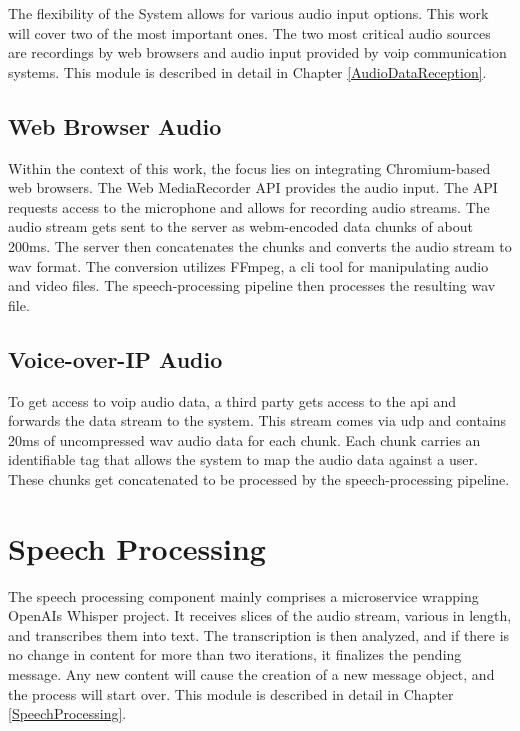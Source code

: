 The flexibility of the System allows for various audio input options. This work will cover two of the most important 
ones. The two most critical audio sources are recordings by web browsers and audio input provided by \ac{voip} 
communication systems. This module is described in detail in Chapter \ref{AudioDataReception}.

\subsection{Web Browser Audio}

Within the context of this work, the focus lies on integrating Chromium-based web browsers. The Web MediaRecorder API 
provides the audio input. The API requests access to the microphone and allows for recording audio streams. 
The audio stream gets sent to the server as \ac{webm}-encoded data chunks of about 200ms. The server then concatenates 
the chunks and converts the audio stream to \ac{wav} format. The conversion utilizes FFmpeg, a \ac{cli} tool for 
manipulating audio and video files. The speech-processing pipeline then processes the resulting \ac{wav} file.

\subsection{Voice-over-IP Audio}

To get access to \ac{voip} audio data, a third party gets access to the \ac{api} and forwards the data stream to the 
system. This stream comes via \ac{udp} and contains 20ms of uncompressed \ac{wav} audio data for each chunk.
Each chunk carries an identifiable tag that allows the system to map the audio data against a user.
These chunks get concatenated to be processed by the speech-processing pipeline.


\section{Speech Processing}

The speech processing component mainly comprises a microservice wrapping OpenAIs Whisper project. It receives slices of 
the audio stream, various in length, and transcribes them into text. The transcription is then analyzed, and if there 
is no change in content for more than two iterations, it finalizes the pending message. Any new content will cause the 
creation of a new message object, and the process will start over. This module is described in detail in Chapter 
\ref{SpeechProcessing}.

